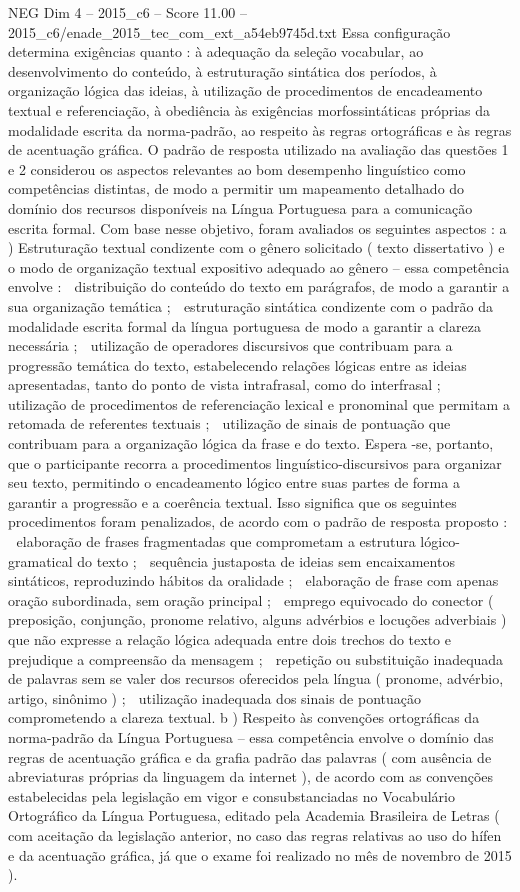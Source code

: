 \begin{textsample}{NEG Dim 4 – 2015\_c6 – Score 11.00 – 2015\_c6/enade\_2015\_tec\_com\_ext\_a54eb9745d.txt}
Essa configuração determina exigências quanto : à adequação da seleção vocabular, ao desenvolvimento do conteúdo, à estruturação sintática dos períodos, à organização lógica das ideias, à utilização de procedimentos de encadeamento textual e referenciação, à obediência às exigências morfossintáticas próprias da modalidade escrita da norma-padrão, ao respeito às regras ortográficas e às regras de acentuação gráfica.
O padrão de resposta utilizado na avaliação das questões 1 e 2 considerou os aspectos relevantes ao bom desempenho linguístico como competências distintas, de modo a permitir um mapeamento detalhado do domínio dos recursos disponíveis na Língua Portuguesa para a comunicação escrita formal.
Com base nesse objetivo, foram avaliados os seguintes aspectos : a ) Estruturação textual condizente com o gênero solicitado ( texto dissertativo ) e o modo de organização textual expositivo adequado ao gênero – essa competência envolve :  distribuição do conteúdo do texto em parágrafos, de modo a garantir a sua organização temática ;  estruturação sintática condizente com o padrão da modalidade escrita formal da língua portuguesa de modo a garantir a clareza necessária ;  utilização de operadores discursivos que contribuam para a progressão temática do texto, estabelecendo relações lógicas entre as ideias apresentadas, tanto do ponto de vista intrafrasal, como do interfrasal ;  utilização de procedimentos de referenciação lexical e pronominal que permitam a retomada de referentes textuais ;  utilização de sinais de pontuação que contribuam para a organização lógica da frase e do texto.
Espera -se, portanto, que o participante recorra a procedimentos linguístico-discursivos para organizar seu texto, permitindo o encadeamento lógico entre suas partes de forma a garantir a progressão e a coerência textual.
Isso significa que os seguintes procedimentos foram penalizados, de acordo com o padrão de resposta proposto :  elaboração de frases fragmentadas que comprometam a estrutura lógico-gramatical do texto ;  sequência justaposta de ideias sem encaixamentos sintáticos, reproduzindo hábitos da oralidade ;  elaboração de frase com apenas oração subordinada, sem oração principal ;  emprego equivocado do conector ( preposição, conjunção, pronome relativo, alguns advérbios e locuções adverbiais ) que não expresse a relação lógica adequada entre dois trechos do texto e prejudique a compreensão da mensagem ;  repetição ou substituição inadequada de palavras sem se valer dos recursos oferecidos pela língua ( pronome, advérbio, artigo, sinônimo ) ;  utilização inadequada dos sinais de pontuação comprometendo a clareza textual. b ) Respeito às convenções ortográficas da norma-padrão da Língua Portuguesa – essa competência envolve o domínio das regras de acentuação gráfica e da grafia padrão das palavras ( com ausência de abreviaturas próprias da linguagem da internet ), de acordo com as convenções estabelecidas pela legislação em vigor e consubstanciadas no Vocabulário Ortográfico da Língua Portuguesa, editado pela Academia Brasileira de Letras ( com aceitação da legislação anterior, no caso das regras relativas ao uso do hífen e da acentuação gráfica, já que o exame foi realizado no mês de novembro de 2015 ).

\end{textsample}
